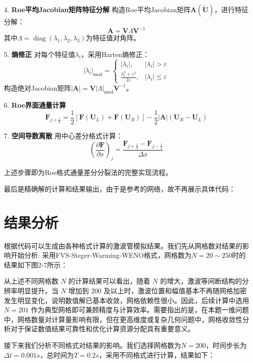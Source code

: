 \documentclass[12pt,a4paper]{article}
\begin{document}
4. \textbf{Roe平均Jacobian矩阵特征分解}  
    构造Roe平均Jacobian矩阵$\mathbf{A}(\tilde{\mathbf{U}})$，进行特征分解：
    \[
    \mathbf{A} = \mathbf{V} \Lambda \mathbf{V}^{-1}
    \]
    其中$\Lambda = \operatorname{diag}(\lambda_1, \lambda_2, \lambda_3)$为特征值对角阵。

5. \textbf{熵修正}  
    对每个特征值$\lambda_i$，采用Harten熵修正：
    \[
    |\lambda_i|_{\text{mod}} = 
    \begin{cases}
    |\lambda_i|, & |\lambda_i| > \varepsilon \\
    \frac{\lambda_i^2 + \varepsilon^2}{2\varepsilon}, & |\lambda_i| \leq \varepsilon
    \end{cases}
    \]
    构造绝对Jacobian矩阵$|\mathbf{A}| = \mathbf{V} |\Lambda|_{\text{mod}} \mathbf{V}^{-1}$。

6. \textbf{Roe界面通量计算}  
    \[
    \mathbf{F}_{j+\frac{1}{2}} = \frac{1}{2} \left[ \mathbf{F}(\mathbf{U}_L) + \mathbf{F}(\mathbf{U}_R) \right] - \frac{1}{2} |\mathbf{A}| (\mathbf{U}_R - \mathbf{U}_L)
    \]

7. \textbf{空间导数离散}  
    用中心差分格式计算：
    \[
    \left( \frac{\partial \mathbf{F}}{\partial x} \right)_j = \frac{\mathbf{F}_{j+\frac{1}{2}} - \mathbf{F}_{j-\frac{1}{2}}}{\Delta x}
    \]

上述步骤即为Roe格式通量差分分裂法的完整实现流程。

最后是精确解的计算和结果输出，由于是参考的网络，故不再展示具体代码：


  
\section{结果分析}
根据代码可以生成由各种格式计算的激波管模拟结果。我们先从网格数对结果的影响开始分析:
采用FVS-Steger-Warming-WENO格式，网格数为$N=20\sim250$时的结果如下图2-7所示：

从上述不同网格数 $N$ 的计算结果可以看出，随着 $N$ 的增大，激波等间断结构的分辨率明显提升。当 $N$ 增加到 200 及以上时，激波位置和幅值基本不再随网格加密发生明显变化，说明数值解已基本收敛，网格依赖性很小。因此，后续计算中选用 $N=201$ 作为典型网格即可兼顾精度与计算效率。需要指出的是，在本题一维问题中，网格数量对计算量影响有限，但在更高维度或复杂几何问题中，网格收敛性分析对于保证数值结果可靠性和优化计算资源分配具有重要意义。
 
接下来我们分析不同格式对结果的影响。我们选择网格数为$N=200$，时间步长为$\Delta t=0.001s$，总时间为$T=0.2s$，采用不同格式进行计算，结果如下：
\end{document}
